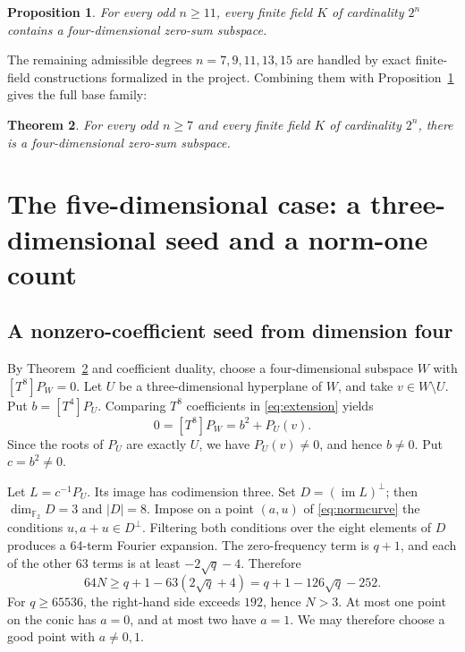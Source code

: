 \documentclass[11pt]{amsart}
\numberwithin{equation}{section}
\newtheorem{theorem}{Theorem}[section]
\newtheorem{proposition}[theorem]{Proposition}
\theoremstyle{definition}
\theoremstyle{remark}
\newcommand{\Ftwo}{\mathbb F_2}
\newcommand{\dimf}{\dim_{\Ftwo}}
\begin{document}
\begin{proposition}\label{prop:k4large}
For every odd $n\ge11$, every finite field $K$ of cardinality $2^n$ contains a four-dimensional zero-sum subspace.
\end{proposition}

The remaining admissible degrees $n=7,9,11,13,15$ are handled by exact finite-field constructions formalized in the project. Combining them with Proposition~\ref{prop:k4large} gives the full base family:
\begin{theorem}\label{thm:k4}
For every odd $n\ge7$ and every finite field $K$ of cardinality $2^n$, there is a four-dimensional zero-sum subspace.
\end{theorem}

\section{The five-dimensional case: a three-dimensional seed and a norm-one count}

\subsection{A nonzero-coefficient seed from dimension four}

By Theorem~\ref{thm:k4} and coefficient duality, choose a four-dimensional subspace $W$ with $[T^8]P_W=0$. Let $U$ be a three-dimensional hyperplane of $W$, and take $v\in W\setminus U$. Put $b=[T^4]P_U$. Comparing $T^8$ coefficients in \eqref{eq:extension} yields
\[
 0=[T^8]P_W=b^2+P_U(v).
\]
Since the roots of $P_U$ are exactly $U$, we have $P_U(v)\ne0$, and hence $b\ne0$. Put $c=b^2\ne0$.

Let $L=c^{-1}P_U$. Its image has codimension three. Set $D=(\operatorname{im}L)^\perp$; then $\dimf D=3$ and $|D|=8$. Impose on a point $(a,u)$ of \eqref{eq:normcurve} the conditions $u,a+u\in D^\perp$. Filtering both conditions over the eight elements of $D$ produces a 64-term Fourier expansion. The zero-frequency term is $q+1$, and each of the other 63 terms is at least $-2\sqrt q-4$. Therefore
\begin{equation}\label{eq:k5count}
 64N\ge q+1-63(2\sqrt q+4)=q+1-126\sqrt q-252.
\end{equation}
For $q\ge65536$, the right-hand side exceeds $192$, hence $N>3$. At most one point on the conic has $a=0$, and at most two have $a=1$. We may therefore choose a good point with $a\ne0,1$.
\end{document}
